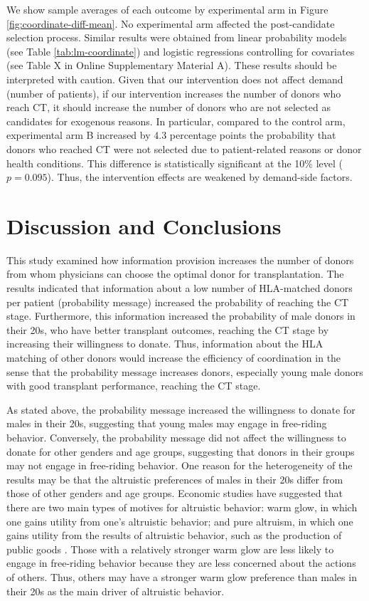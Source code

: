 \documentclass[12pt, a4paper]{article}
\begin{document}
We show sample averages of each outcome by experimental arm in Figure \ref{fig:coordinate-diff-mean}. No experimental arm affected the post-candidate selection process. Similar results were obtained from linear probability models (see Table \ref{tab:lm-coordinate}) and logistic regressions controlling for covariates (see Table X in Online Supplementary Material A). These results should be interpreted with caution. Given that our intervention does not affect demand (number of patients), if our intervention increases the number of donors who reach CT, it should increase the number of donors who are not selected as candidates for exogenous reasons. In particular, compared to the control arm, experimental arm B increased by \(4.3\) percentage points the probability that donors who reached CT were not selected due to patient-related reasons or donor health conditions. This difference is statistically significant at the 10\% level (\(p = 0.095\)). Thus, the intervention effects are weakened by demand-side factors.

\hypertarget{conclusion}{%
\section{Discussion and Conclusions}\label{conclusion}}

This study examined how information provision increases the number of donors from whom physicians can choose the optimal donor for transplantation. The results indicated that information about a low number of HLA-matched donors per patient (probability message) increased the probability of reaching the CT stage. Furthermore, this information increased the probability of male donors in their 20s, who have better transplant outcomes, reaching the CT stage by increasing their willingness to donate. Thus, information about the HLA matching of other donors would increase the efficiency of coordination in the sense that the probability message increases donors, especially young male donors with good transplant performance, reaching the CT stage.

As stated above, the probability message increased the willingness to donate for males in their 20s, suggesting that young males may engage in free-riding behavior. Conversely, the probability message did not affect the willingness to donate for other genders and age groups, suggesting that donors in their groups may not engage in free-riding behavior. One reason for the heterogeneity of the results may be that the altruistic preferences of males in their 20s differ from those of other genders and age groups. Economic studies have suggested that there are two main types of motives for altruistic behavior: warm glow, in which one gains utility from one's altruistic behavior; and pure altruism, in which one gains utility from the results of altruistic behavior, such as the production of public goods \citep[e.g.,][]{Andreoni1990}. Those with a relatively stronger warm glow are less likely to engage in free-riding behavior because they are less concerned about the actions of others. Thus, others may have a stronger warm glow preference than males in their 20s as the main driver of altruistic behavior.
\end{document}
